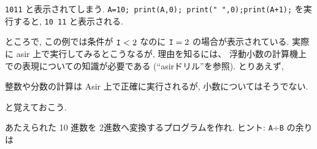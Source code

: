 \documentclass{jbook}
\begin{document}
\begin{example}
{\tt 1011} と表示されてしまう.
{\tt A=10; print(A,0); print(" ",0);print(A+1);} 
を実行すると,
{\tt 10 11} と表示される.
\end{example}

ところで, この例では条件が ${\tt I}<2$ なのに ${\tt I}=2$ 
の場合が表示されている.
実際に asir 上で実行してみるとこうなるが, 理由を知るには、
浮動小数の計算機上での表現についての知識が必要である
(``asirドリル''を参照).
とりあえず, 
\begin{FRAME}
整数や分数の計算は Asir 上で正確に実行されるが,
小数についてはそうでない. 
\end{FRAME}
と覚えておこう.

\begin{problem}
  あたえられた 10 進数を 2進数へ変換するプログラムを作れ.
 ヒント: {\tt A}÷{\tt B} の余りは \verb@A%B@ で計算できる.
\end{problem}
\end{document}
